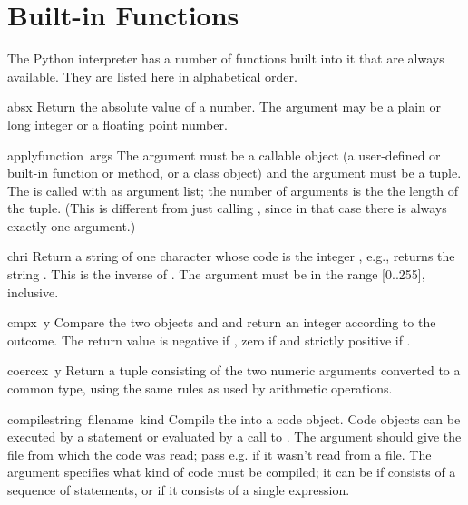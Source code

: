 \section{Built-in Functions}

The Python interpreter has a number of functions built into it that
are always available.  They are listed here in alphabetical order.


\renewcommand{\indexsubitem}{(built-in function)}
\begin{funcdesc}{abs}{x}
  Return the absolute value of a number.  The argument may be a plain
  or long integer or a floating point number.
\end{funcdesc}

\begin{funcdesc}{apply}{function\, args}
The  argument must be a callable object (a user-defined or
built-in function or method, or a class object) and the 
argument must be a tuple.  The  is called with
 as argument list; the number of arguments is the the length
of the tuple.  (This is different from just calling
, since in that case there is always
exactly one argument.)
\end{funcdesc}

\begin{funcdesc}{chr}{i}
  Return a string of one character whose \ASCII{} code is the integer
  , e.g.,  returns the string .  This is the
  inverse of .  The argument must be in the range [0..255],
  inclusive.
\end{funcdesc}

\begin{funcdesc}{cmp}{x\, y}
  Compare the two objects  and  and return an integer
  according to the outcome.  The return value is negative if , zero if  and strictly positive if
  .
\end{funcdesc}

\begin{funcdesc}{coerce}{x\, y}
  Return a tuple consisting of the two numeric arguments converted to
  a common type, using the same rules as used by arithmetic
  operations.
\end{funcdesc}

\begin{funcdesc}{compile}{string\, filename\, kind}
  Compile the  into a code object.  Code objects can be
  executed by a  statement or evaluated by a call to
  .  The  argument should
  give the file from which the code was read; pass e.g. 
  if it wasn't read from a file.  The  argument specifies
  what kind of code must be compiled; it can be  if
   consists of a sequence of statements, or 
  if it consists of a single expression.
\end{funcdesc}

